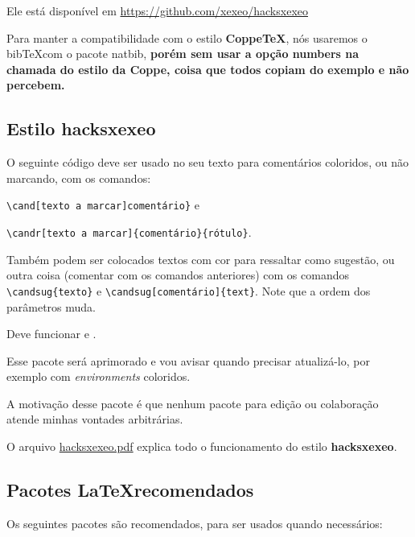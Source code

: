 \documentclass{article}
\begin{document}
\begin{outline}
Ele está  disponível em \url{https://github.com/xexeo/hacksxexeo}

Para manter a compatibilidade com o estilo \textbf{CoppeTeX}, nós usaremos o bib\TeX com o pacote natbib, \textbf{porém sem usar a opção numbers na chamada do estilo da Coppe, coisa que todos copiam do exemplo e não percebem.}


\subsection{Estilo hacksxexeo}

O seguinte código deve ser usado no seu texto para comentários coloridos,  ou não marcando, com os comandos:

\verb!\cand[texto a marcar]comentário}! e 

\verb!\candr[texto a marcar]{comentário}{rótulo}!.

Também podem ser colocados textos com cor para ressaltar como sugestão, ou outra coisa (comentar com os comandos anteriores) com os comandos \verb!\candsug{texto}! e
\verb!\candsug[comentário]{text}!. Note que a ordem dos parâmetros muda.

Deve funcionar  e .

Esse pacote será aprimorado e vou avisar quando precisar atualizá-lo, por exemplo com \textit{environments} coloridos.

A motivação desse pacote é que nenhum pacote para edição ou colaboração atende minhas vontades arbitrárias.

O arquivo \href{https://github.com/xexeo/hacksxexeo/blob/main/dist/hacksxexeo.pdf}{hacksxexeo.pdf} explica todo o funcionamento do estilo \textbf{hacksxexeo}.


\subsection{Pacotes \LaTeX recomendados}
    
    
Os seguintes pacotes são recomendados, para ser usados quando necessários:    
        

\end{outline}
\end{document}
